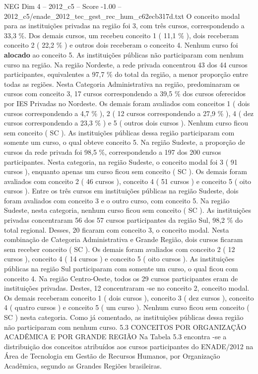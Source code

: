 \begin{textsample}{NEG Dim 4 – 2012\_c5 – Score -1.00 – 2012\_c5/enade\_2012\_tec\_gest\_rec\_hum\_c62ecb317d.txt}
O conceito modal para as instituições privadas na região foi 3, com três cursos, correspondendo a 33,3 \%.
Dos demais cursos, um recebeu conceito 1 ( 11,1 \% ), dois receberam conceito 2 ( 22,2 \% ) e outros dois receberam o conceito 4.
Nenhum curso foi \textbf{alocado} ao conceito 5.
As instituições públicas não participaram com nenhum curso na região.
Na região Nordeste, a rede privada concentrou 43 dos 44 cursos participantes, equivalentes a 97,7 \% do total da região, a menor proporção entre todas as regiões.
Nesta Categoria Administrativa na região, predominaram os cursos com conceito 3, 17 cursos correspondendo a 39,5 \% dos cursos oferecidos por IES Privadas no Nordeste.
Os demais foram avaliados com conceitos 1 ( dois cursos correspondendo a 4,7 \% ), 2 ( 12 cursos correspondendo a 27,9 \% ), 4 ( dez cursos correspondendo a 23,3 \% ) e 5 ( outros dois cursos ).
Nenhum curso ficou sem conceito ( SC ).
As instituições públicas dessa região participaram com somente um curso, o qual obteve conceito 5.
Na região Sudeste, a proporção de cursos da rede privada foi 98,5 \%, correspondendo a 197 dos 200 cursos participantes.
Nesta categoria, na região Sudeste, o conceito modal foi 3 ( 91 cursos ), enquanto apenas um curso ficou sem conceito ( SC ).
Os demais foram avaliados com conceito 2 ( 46 cursos ), conceito 4 ( 51 cursos ) e conceito 5 ( oito cursos ).
Entre os três cursos em instituições públicas na região Sudeste, dois foram avaliados com conceito 3 e o outro curso, com conceito 5.
Na região Sudeste, nesta categoria, nenhum curso ficou sem conceito ( SC ).
As instituições privadas concentraram 56 dos 57 cursos participantes da região Sul, 98,2 \% do total regional.
Desses, 20 ficaram com conceito 3, o conceito modal.
Nesta combinação de Categoria Administrativa e Grande Região, dois cursos ficaram sem receber conceito ( SC ).
Os demais foram avaliados com conceito 2 ( 12 cursos ), conceito 4 ( 14 cursos ) e conceito 5 ( oito cursos ).
As instituições públicas na região Sul participaram com somente um curso, o qual ficou com conceito 4.
Na região Centro-Oeste, todos os 29 cursos participantes eram de instituições privadas.
Destes, 12 concentraram -se no conceito 2, conceito modal.
Os demais receberam conceito 1 ( dois cursos ), conceito 3 ( dez cursos ), conceito 4 ( quatro cursos ) e conceito 5 ( um curso ).
Nenhum curso ficou sem conceito ( SC ) nesta categoria.
Como já comentado, as instituições públicas dessa região não participaram com nenhum curso. 5.3 CONCEITOS POR ORGANIZAÇÃO ACADÊMICA E POR GRANDE REGIÃO Na Tabela 5.3 encontra -se a distribuição dos conceitos atribuídos aos cursos participantes do ENADE/2012 na Área de Tecnologia em Gestão de Recursos Humanos, por Organização Acadêmica, segundo as Grandes Regiões brasileiras.

\end{textsample}
